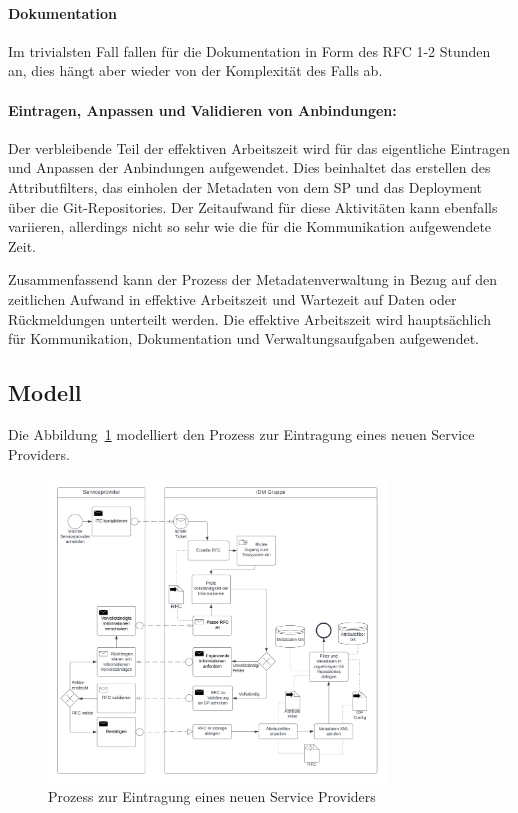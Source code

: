 \documentclass[a4paper, fontsize=11pt]{scrartcl}
\begin{document}
\paragraph{Dokumentation}
Im trivialsten Fall fallen für die Dokumentation in Form des RFC 1-2 Stunden an, dies hängt aber wieder von der Komplexität des Falls ab. 
\paragraph{Eintragen, Anpassen und Validieren von Anbindungen:}
Der verbleibende Teil der effektiven Arbeitszeit wird für das eigentliche Eintragen und Anpassen der Anbindungen aufgewendet.
Dies beinhaltet das erstellen des Attributfilters, das einholen der Metadaten von dem SP und das Deployment über die Git-Repositories.
Der Zeitaufwand für diese Aktivitäten kann ebenfalls variieren, allerdings nicht so sehr wie die für die Kommunikation aufgewendete Zeit.


Zusammenfassend kann der Prozess der Metadatenverwaltung in Bezug auf den zeitlichen Aufwand in effektive Arbeitszeit und Wartezeit auf Daten oder Rückmeldungen unterteilt werden. 
Die effektive Arbeitszeit wird hauptsächlich für Kommunikation, Dokumentation und Verwaltungsaufgaben aufgewendet.
\subsection{Modell}
Die Abbildung~\ref{fig:service-provider-erstellung} modelliert den Prozess zur Eintragung eines neuen Service Providers.
\begin{figure}[H]
  \centering
  \includegraphics[width=0.8\textwidth]{res/Service Provider Erstellung.png}
  \caption{Prozess zur Eintragung eines neuen Service Providers}\label{fig:service-provider-erstellung}
\end{figure}
\end{document}
